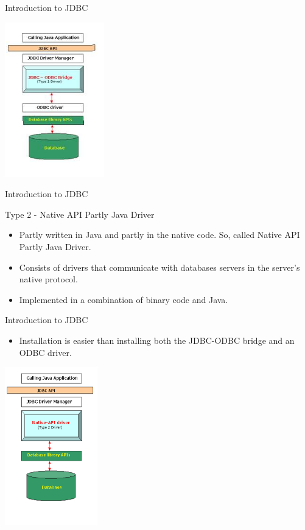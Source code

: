 \documentclass[14pt]{beamer}
\begin{document}
\begin{frame}{Introduction to JDBC}
\begin{center}
    \includegraphics[scale=0.5]{JEE-M03-S01-Image2.png}
  \end{center}
\end{frame}



\begin{frame}{Introduction to JDBC}
\begin{block}{}
  Type 2 - Native API Partly Java Driver
\end{block}
\begin{itemize}
\item Partly written in Java and partly in the native code. So, called Native API Partly Java Driver.
\item Consists of drivers that communicate with databases servers in the server’s native protocol.
\item Implemented in a combination of binary code and Java.
\end{itemize}
\end{frame}

\begin{frame}{Introduction to JDBC}
\begin{itemize}
\item Installation is easier than installing both the JDBC-ODBC bridge and an ODBC driver.
\end{itemize}
\begin{center}
    \includegraphics[scale=0.5]{JEE-M03-S01-Image3.png}
  \end{center}
\end{frame}
\end{document}
